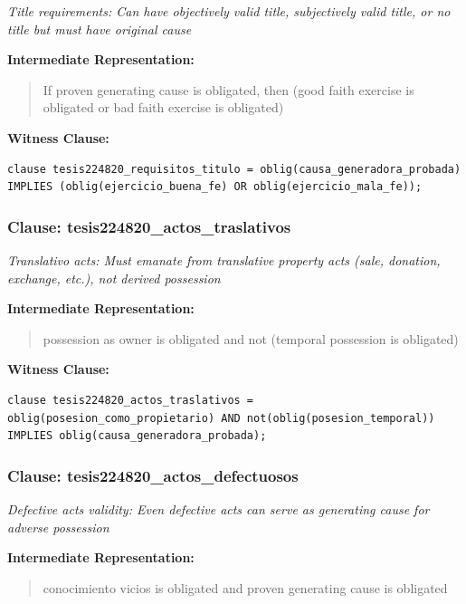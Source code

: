 \documentclass[11pt,a4paper]{article}
\begin{document}
\textit{Title requirements: Can have objectively valid title, subjectively valid title, or no title but must have original cause}

\textbf{Intermediate Representation:}

\begin{quote}
If proven generating cause is obligated, then (good faith exercise is obligated or bad faith exercise is obligated)
\end{quote}

\textbf{Witness Clause:}

\begin{lstlisting}[style=witnessstyle, language=Witness]
clause tesis224820_requisitos_titulo = oblig(causa_generadora_probada) IMPLIES (oblig(ejercicio_buena_fe) OR oblig(ejercicio_mala_fe));
\end{lstlisting}

\subsubsection{Clause: tesis224820\_actos\_traslativos}

\textit{Translativo acts: Must emanate from translative property acts (sale, donation, exchange, etc.), not derived possession}

\textbf{Intermediate Representation:}

\begin{quote}
possession as owner is obligated and not (temporal possession is obligated)
\end{quote}

\textbf{Witness Clause:}

\begin{lstlisting}[style=witnessstyle, language=Witness]
clause tesis224820_actos_traslativos = oblig(posesion_como_propietario) AND not(oblig(posesion_temporal)) IMPLIES oblig(causa_generadora_probada);
\end{lstlisting}

\subsubsection{Clause: tesis224820\_actos\_defectuosos}

\textit{Defective acts validity: Even defective acts can serve as generating cause for adverse possession}

\textbf{Intermediate Representation:}

\begin{quote}
conocimiento vicios is obligated and proven generating cause is obligated
\end{quote}
\end{document}
